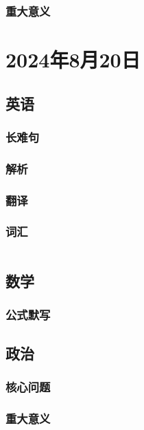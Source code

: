\documentclass[UTF8]{ctexart}
\begin{document}
\subsubsection{重大意义}
\section{2024年8月20日}
\subsection{英语}
\subsubsection{长难句}
\subsubsection{解析}
\subsubsection{翻译}
\subsubsection{词汇}\begin{table}[h]
      \centering
      \begin{tabular}{p{}p{}}
      \end{tabular}
\end{table}
\subsection{数学}
\subsubsection{公式默写}
\begin{multicols}{2}
\end{multicols}
\subsection{政治}
\subsubsection{}
\subsubsection{核心问题}
\subsubsection{重大意义}
\end{document}
